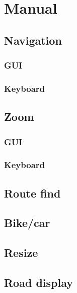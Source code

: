 \chapter{Manual}
\label{MAN}

\section{Navigation}
\label{MAN-N}
\subsection{GUI}
\label{MAN-N-GUI}
\subsection{Keyboard}
\label{MAN-N-KEY}

\section{Zoom}
\label{MAN-Z}
\subsection{GUI}
\label{MAN-Z-GUI}
\subsection{Keyboard}
\label{MAN-Z-KEY}

\section{Route find}
\label{MAN-RF}

\section{Bike/car}
\label{MAN-BC}

\section{Resize}
\label{MAN-RS}

\section{Road display}
\label{MAN-RD}